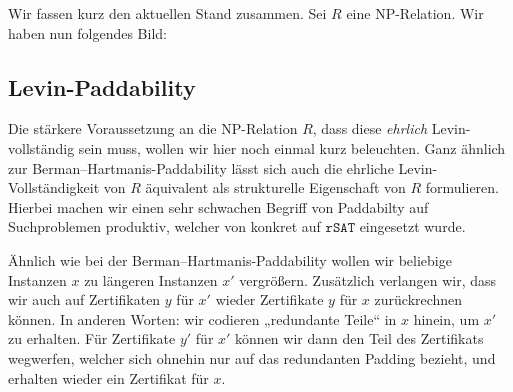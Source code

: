 Wir fassen kurz den aktuellen Stand zusammen. Sei $R$ eine NP-Relation. 
Wir haben nun folgendes Bild:

\begin{center}
\end{center}

\subsection*{Levin-Paddability}

Die stärkere Voraussetzung an die NP-Relation $R$, dass diese \emph{ehrlich} Levin-vollständig sein muss, wollen wir hier noch einmal kurz beleuchten. Ganz ähnlich zur Berman–Hartmanis-Paddability lässt sich auch die ehrliche Levin-Vollständigkeit von $R$ äquivalent als strukturelle Eigenschaft von $R$ formulieren. Hierbei machen wir einen sehr schwachen Begriff von Paddabilty auf Suchproblemen produktiv, welcher von \textcite{messner_simulation_2001} konkret auf $\mathtt{rSAT}$ eingesetzt wurde.

Ähnlich wie bei der Berman–Hartmanis-Paddability wollen wir beliebige Instanzen $x$ zu längeren Instanzen $x'$ vergrößern. Zusätzlich verlangen wir, dass wir auch auf Zertifikaten $y$ für $x'$ wieder Zertifikate $y$ für $x$ zurückrechnen können. In anderen Worten: wir codieren „redundante Teile“ in $x$ hinein, um $x'$ zu erhalten. Für Zertifikate $y'$ für $x'$ können wir dann den Teil des Zertifikats wegwerfen, welcher sich ohnehin nur auf das redundanten Padding bezieht, und erhalten wieder ein Zertifikat für $x$. 


